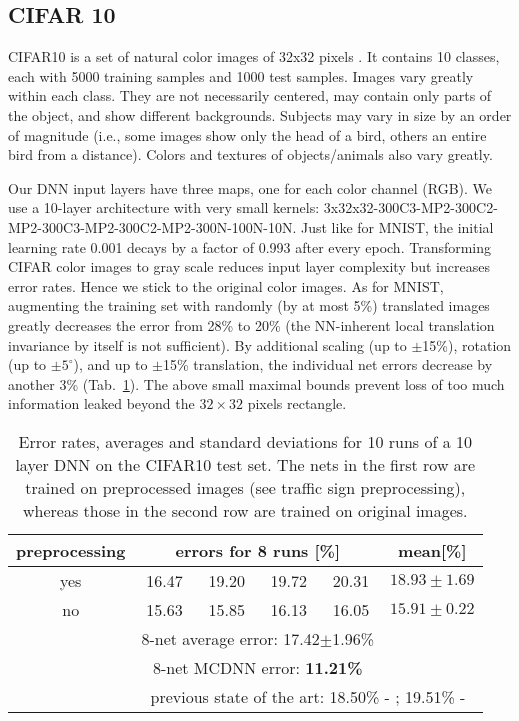 \documentclass[a4paper]{article}
\begin{document}
\subsection{CIFAR 10}
CIFAR10 is a set of  natural color images of 32x32 pixels \cite{krizhevsky:2009}. It contains 10 classes, each with 5000 training samples and 1000 test samples. Images vary greatly within each class. They are not necessarily centered, may contain only parts of the object, and show different backgrounds. Subjects may vary in size by an order of magnitude (i.e., some images show only the head of a bird, others an entire bird from a distance). Colors and textures of objects/animals also vary greatly.
 
Our DNN input layers have three maps, one for each color channel (RGB).  We use a 10-layer architecture with very small kernels:  3x32x32-300C3-MP2-300C2-MP2-300C3-MP2-300C2-MP2-300N-100N-10N. Just like for MNIST, the initial learning rate 0.001 decays by a factor of 0.993 after every epoch. Transforming CIFAR color images to gray scale reduces input layer complexity but increases error rates. Hence we stick to the original color images. As for MNIST, augmenting the training set with randomly (by at most 5\%) translated  images greatly decreases the error from 28\% to 20\% (the NN-inherent local translation invariance by itself is not sufficient). By additional scaling (up to $\pm$15\%), rotation (up to $\pm5^\circ$), and up to $\pm$15\% translation, the individual net errors decrease by another 3\% (Tab.~\ref{tab:CIFAR10}). The above small maximal bounds prevent loss of too much information leaked beyond the $32\times32$ pixels rectangle. 

\begin{table}[!t]
\caption{Error rates, averages and standard deviations for 10 runs of a
10 layer DNN on the CIFAR10 test set. The nets in the first row are trained on preprocessed images (see  traffic sign preprocessing), whereas those in the second row are trained on original images.}
\label{tab:CIFAR10}
\footnotesize
\centering
\begin{tabular}{c|cccc|c}
preprocessing	& \multicolumn{4}{c}{errors for 8 runs [\%]}				&	mean[\%]			\\
\hline
yes 			&	16.47	&	19.20	&	19.72	&	20.31	&	$18.93\pm1.69$		\\
no 			&	15.63	&	15.85	&	16.13	&	16.05	&	$15.91\pm0.22$		\\
\hline
			& \multicolumn{4}{c}{8-net average error:	17.42$\pm$1.96\%}\\
\hline
			& \multicolumn{4}{c}{8-net MCDNN error:	\bf{11.21\%}}\\
\hline
			&	 \multicolumn{5}{c}{previous state of the art: 18.50\% - \cite{CoatesICML:2011}; 19.51\% - \cite{Ciresan:2011a}}\\
\end{tabular}
\end{table}
\end{document}
